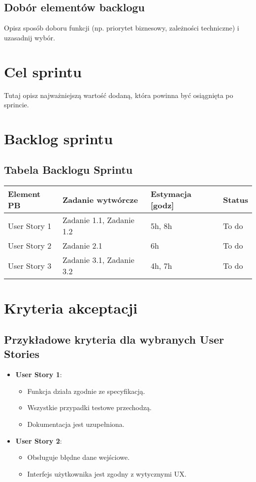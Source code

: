 \documentclass[12pt,a4paper]{article}
\begin{document}
\subsection{Dobór elementów backlogu}
Opisz sposób doboru funkcji (np. priorytet biznesowy, zależności techniczne) i uzasadnij wybór.

\section{Cel sprintu}
Tutaj opisz najważniejszą wartość dodaną, która powinna być osiągnięta po sprincie.

\section{Backlog sprintu}
\subsection{Tabela Backlogu Sprintu}
\begin{tabular}{|p{4cm}|p{5cm}|p{3cm}|p{3cm}|}
\hline
\textbf{Element PB} & \textbf{Zadanie wytwórcze} & \textbf{Estymacja [godz]} & \textbf{Status}\\
\hline
User Story 1 & Zadanie 1.1, Zadanie 1.2 & 5h, 8h & To do\\
\hline
User Story 2 & Zadanie 2.1 & 6h & To do\\
\hline
User Story 3 & Zadanie 3.1, Zadanie 3.2 & 4h, 7h & To do\\
\hline
\end{tabular}

\section{Kryteria akceptacji}
\subsection{Przykładowe kryteria dla wybranych User Stories}
\begin{itemize}
    \item \textbf{User Story 1}:
    \begin{itemize}
        \item Funkcja działa zgodnie ze specyfikacją.
        \item Wszystkie przypadki testowe przechodzą.
        \item Dokumentacja jest uzupełniona.
    \end{itemize}
    \item \textbf{User Story 2}:
    \begin{itemize}
        \item Obsługuje błędne dane wejściowe.
        \item Interfejs użytkownika jest zgodny z wytycznymi UX.
    \end{itemize}
\end{itemize}
\end{document}
